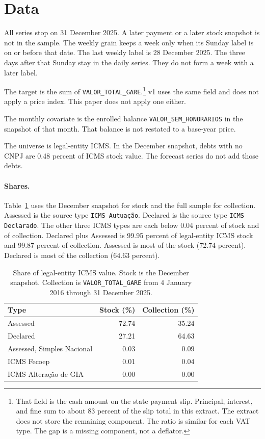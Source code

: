 \section{Data}
\label{sec:data}

All series stop on 31 December 2025.
A later payment or a later stock snapshot is not in the sample.
The weekly grain keeps a week only when its Sunday label is on or before that date.
The last weekly label is 28 December 2025.
The three days after that Sunday stay in the daily series.
They do not form a week with a later label.

The target is the sum of \texttt{VALOR\_TOTAL\_GARE}.\footnote{That field is the cash amount on the state payment slip.
Principal, interest, and fine sum to about 83 percent of the slip total in this extract.
The extract does not store the remaining component.
The ratio is similar for each VAT type.
The gap is a missing component, not a deflator.}
v1 uses the same field and does not apply a price index.
This paper does not apply one either.

The monthly covariate is the enrolled balance \texttt{VALOR\_SEM\_HONORARIOS} in the snapshot of that month.
That balance is not restated to a base-year price.

The universe is legal-entity ICMS.
In the December snapshot, debts with no CNPJ are 0.48 percent of ICMS stock value.
The forecast series do not add those debts.

\paragraph{Shares.}
Table~\ref{tab:shares} uses the December snapshot for stock and the full sample for collection.
Assessed is the source type \texttt{ICMS Autua\c{c}\~ao}.
Declared is the source type \texttt{ICMS Declarado}.
The other three ICMS types are each below 0.04 percent of stock and of collection.
Declared plus Assessed is 99.95 percent of legal-entity ICMS stock and 99.87 percent of collection.
Assessed is most of the stock (72.74 percent).
Declared is most of the collection (64.63 percent).

\begin{table}[t]
  \caption{Share of legal-entity ICMS value.
  Stock is the December snapshot.
  Collection is \texttt{VALOR\_TOTAL\_GARE} from 4 January 2016 through 31 December 2025.}
  \label{tab:shares}
  \centering
  \small
  \begin{tabular}{lrr}
    \toprule
    Type & Stock (\%) & Collection (\%) \\
    \midrule
    Assessed & 72.74 & 35.24 \\
    Declared & 27.21 & 64.63 \\
    Assessed, Simples Nacional & 0.03 & 0.09 \\
    ICMS Fecoep & 0.01 & 0.04 \\
    ICMS Altera\c{c}\~ao de GIA & 0.00 & 0.00 \\
    \bottomrule
  \end{tabular}
\end{table}

